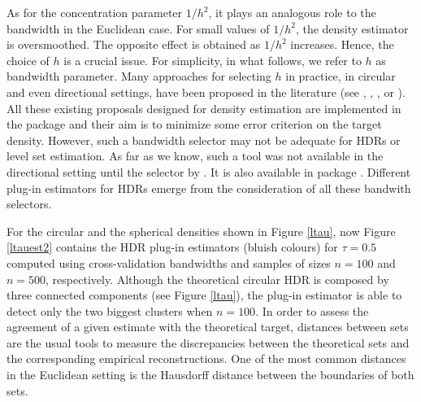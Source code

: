 As for the concentration parameter $1/h^2$, it plays an analogous role to the bandwidth in the Euclidean case. For small values of $1/h^2$, the density estimator is oversmoothed. The opposite effect is obtained as $1/h^2$ increases. Hence, the choice of $h$ is a crucial issue. For simplicity, in what follows, we refer to $h$ as bandwidth parameter. Many approaches for selecting $h$ in practice, in circular and even directional settings, have been proposed in the literature (see \citealp{taylor2008automatic}, \citealp{oliveira2012plug}, \citealp{hall1987kernel}, \citealp{di2011kernel} or \citealp{garcia2013exact}). All these existing proposals designed for density estimation are implemented in the package  and their aim is to minimize some error criterion on the target density. However, such a bandwidth selector may not be adequate for HDRs or level set estimation. As far as we know, such a tool was not available in the directional setting until the selector by \cite{saavedra2020nonparametric}. It is also available in package . Different plug-in estimators for HDRs emerge from the consideration of all these bandwith selectors.




For the circular and the spherical densities shown in Figure \ref{ltau}, now Figure \ref{ltauest2} contains the HDR plug-in estimators (bluish colours) for $\tau=0.5$ computed  using cross-validation bandwidths and samples of sizes $n=100$ and $n=500$, respectively. Although the theoretical circular HDR is composed by three connected components (see Figure \ref{ltau}), the plug-in estimator is able to detect only the two biggest clusters when $n=100$. In order to assess the agreement of a given estimate with the theoretical target, distances between sets are the usual tools to measure the discrepancies between the theoretical sets and the corresponding empirical reconstructions. One of the most common distances in the Euclidean setting is the Hausdorff distance between the boundaries of both sets.


